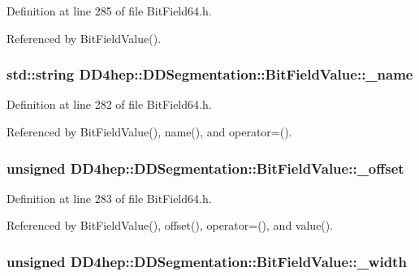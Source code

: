 Definition at line 285 of file BitField64.h.

Referenced by BitFieldValue().\hypertarget{class_d_d4hep_1_1_d_d_segmentation_1_1_bit_field_value_a0fe0475b6dcbe318bcba73096a20eb2f}{
\subsubsection[{\_\-name}]{\setlength{\rightskip}{0pt plus 5cm}std::string {\bf DD4hep::DDSegmentation::BitFieldValue::\_\-name}}}
\label{class_d_d4hep_1_1_d_d_segmentation_1_1_bit_field_value_a0fe0475b6dcbe318bcba73096a20eb2f}


Definition at line 282 of file BitField64.h.

Referenced by BitFieldValue(), name(), and operator=().\hypertarget{class_d_d4hep_1_1_d_d_segmentation_1_1_bit_field_value_aaec5eef97c6b194e309a3467fedb391c}{
\subsubsection[{\_\-offset}]{\setlength{\rightskip}{0pt plus 5cm}unsigned {\bf DD4hep::DDSegmentation::BitFieldValue::\_\-offset}}}
\label{class_d_d4hep_1_1_d_d_segmentation_1_1_bit_field_value_aaec5eef97c6b194e309a3467fedb391c}


Definition at line 283 of file BitField64.h.

Referenced by BitFieldValue(), offset(), operator=(), and value().\hypertarget{class_d_d4hep_1_1_d_d_segmentation_1_1_bit_field_value_afe3513613815254bce43b62ef21b9f20}{
\subsubsection[{\_\-width}]{\setlength{\rightskip}{0pt plus 5cm}unsigned {\bf DD4hep::DDSegmentation::BitFieldValue::\_\-width}}}
\label{class_d_d4hep_1_1_d_d_segmentation_1_1_bit_field_value_afe3513613815254bce43b62ef21b9f20}


